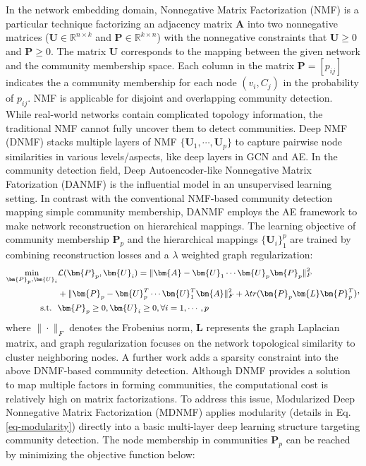 \label{sec-model-nmf}
In the network embedding domain, Nonnegative Matrix Factorization (NMF) is a particular technique factorizing an adjacency matrix $\bm{A}$ into two nonnegative matrices ($\bm{U}\in \mathbb{R}^{n\times k}$ and $\bm{P}\in \mathbb{R}^{k\times n}$) with the nonnegative constraints that $\bm{U}\geq 0$ and $\bm{P}\geq 0$. The matrix $\bm{U}$ corresponds to the mapping between the given network and the community membership space. Each column in the matrix $\bm{P} = [p_{ij}]$ indicates the a community membership for each node $(v_i,C_j)$ in the probability of $p_{ij}$. NMF is applicable for disjoint and overlapping community detection. While real-world networks contain complicated topology information, the traditional NMF cannot fully uncover them to detect communities. Deep NMF (DNMF)  stacks multiple layers of NMF $\{\bm{U}_1,\cdots,\bm{U}_p\}$ to capture pairwise node similarities in various levels/aspects, like deep layers in GCN and AE.
In the community detection field, Deep Autoencoder-like Nonnegative Matrix Fatorization (DANMF)  is the influential model in an unsupervised learning setting. In contrast with the conventional NMF-based community detection mapping simple community membership, DANMF employs the AE framework to make network reconstruction on hierarchical mappings. The learning objective of community membership $\bm{P}_p$ and the hierarchical mappings $\{\bm{U}_i\}^p_1$ are trained by combining reconstruction losses and a $\lambda$ weighted graph regularization:
\begin{equation}
\small
\begin{aligned}
\min_{\bm{P}_p,\bm{U}_i} & \mathcal{L}(\bm{P}_p,\bm{U}_i) = \|\bm{A} - \bm{U}_1\cdots \bm{U}_p \bm{P}_p\|_F^2 \\ 
&  +\|\bm{P}_p - \bm{U}_p^T\cdots \bm{U}_1^T \bm{A}\|_F^2 + \lambda tr(\bm{P}_p \bm{L} \bm{P}_p^T) \\
\text{s.t.} ~~ & \bm{P}_p \geq 0, \bm{U}_i \geq 0, \forall i=1,\cdots,p
\end{aligned},
\end{equation}
where $\|\cdot\|_F$ denotes the Frobenius norm, $\bm{L}$ represents the graph Laplacian matrix, and graph regularization focuses on the network topological similarity to cluster neighboring nodes. A further work  adds a sparsity constraint into the above DNMF-based community detection.
Although DNMF provides a solution to map multiple factors in forming communities, the computational cost is relatively high on matrix factorizations. To address this issue, Modularized Deep Nonnegative Matrix Factorization (MDNMF)  applies modularity (details in Eq. \eqref{eq-modularity}) directly into a basic multi-layer deep learning structure targeting community detection. The node membership in communities $\bm{P}_p$ can be reached by minimizing the objective function below:
